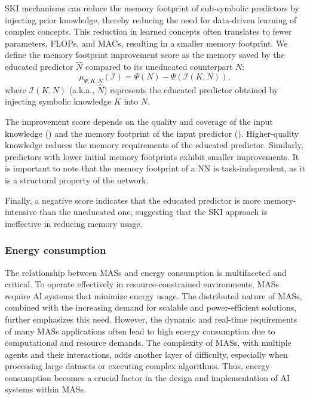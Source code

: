 %
\Gls{SKI} mechanisms can reduce the memory footprint of sub-symbolic predictors by injecting prior knowledge, thereby reducing the need for data-driven learning of complex concepts.
%
This reduction in learned concepts often translates to fewer parameters, \glspl{FLOP}, and \glspl{MAC}, resulting in a smaller memory footprint.
%
We define the memory footprint improvement score as the memory saved by the educated predictor \(\hat{N}\) compared to its uneducated counterpart \(N\):
%
\begin{equation}
    \label{eq:memory-footprint-improvement-score}
    \mu_{\Psi, K, N}(\mathcal{I}) = \Psi(N) - \Psi(\mathcal{I}(K, N)),
\end{equation}
%
where \(\mathcal{I}(K, N)\) (a.k.a., $\hat{N}$) represents the educated predictor obtained by injecting symbolic knowledge \(K\) into \(N\).

%
The improvement score depends on the quality and coverage of the input knowledge () and the memory footprint of the input predictor ().
%
Higher-quality knowledge reduces the memory requirements of the educated predictor.
%
Similarly, predictors with lower initial memory footprints exhibit smaller improvements.
%
It is important to note that the memory footprint of a \gls{NN} is task-independent, as it is a structural property of the network.

%
Finally, a negative score indicates that the educated predictor is more memory-intensive than the uneducated one, suggesting that the \gls{SKI} approach is ineffective in reducing memory usage.


\subsubsection{Energy consumption}\label{subsubsec:ski-meets-intelligent-agents-energy-consumption}
%
The relationship between \glspl{MAS} and energy consumption is multifaceted and critical.
%
To operate effectively in resource-constrained environments, \glspl{MAS} require \gls{AI} systems that minimize energy usage.
%
The distributed nature of \glspl{MAS}, combined with the increasing demand for scalable and power-efficient solutions, further emphasizes this need.
%
However, the dynamic and real-time requirements of many \glspl{MAS} applications often lead to high energy consumption due to computational and resource demands.
%
The complexity of \glspl{MAS}, with multiple agents and their interactions, adds another layer of difficulty, especially when processing large datasets or executing complex algorithms.
%
Thus, energy consumption becomes a crucial factor in the design and implementation of \gls{AI} systems within \glspl{MAS}.

